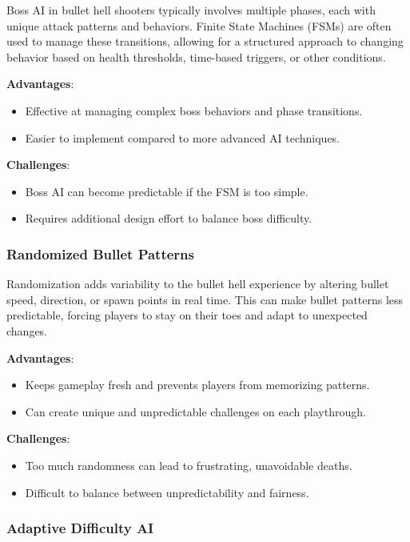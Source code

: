 \documentclass{article} %
\begin{document}
Boss AI in bullet hell shooters typically involves multiple phases, each with unique attack patterns and behaviors. Finite State Machines (FSMs) are often used to manage these transitions, allowing for a structured approach to changing behavior based on health thresholds, time-based triggers, or other conditions.

\textbf{Advantages}:
\begin{itemize}
	\item Effective at managing complex boss behaviors and phase transitions.
	\item Easier to implement compared to more advanced AI techniques.
\end{itemize}

\textbf{Challenges}:
\begin{itemize}
	\item Boss AI can become predictable if the FSM is too simple.
	\item Requires additional design effort to balance boss difficulty.
\end{itemize}

\subsubsection{Randomized Bullet Patterns}

Randomization adds variability to the bullet hell experience by altering bullet speed, direction, or spawn points in real time. This can make bullet patterns less predictable, forcing players to stay on their toes and adapt to unexpected changes.

\textbf{Advantages}:
\begin{itemize}
	\item Keeps gameplay fresh and prevents players from memorizing patterns.
	\item Can create unique and unpredictable challenges on each playthrough.
\end{itemize}

\textbf{Challenges}:
\begin{itemize}
	\item Too much randomness can lead to frustrating, unavoidable deaths.
	\item Difficult to balance between unpredictability and fairness.
\end{itemize}

\subsubsection{Adaptive Difficulty AI}
\end{document}
